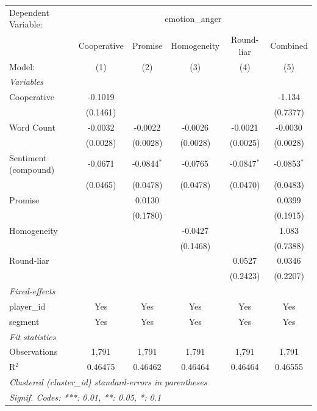 
\begingroup
\centering
\begin{tabular}{lccccc}
   \tabularnewline \midrule \midrule
   Dependent Variable: & \multicolumn{5}{c}{emotion\_anger}\\
                        & Cooperative & Promise       & Homogeneity & Round-liar    & Combined \\   
   Model:               & (1)         & (2)           & (3)         & (4)           & (5)\\  
   \midrule
   \emph{Variables}\\
   Cooperative          & -0.1019     &               &             &               & -1.134\\   
                        & (0.1461)    &               &             &               & (0.7377)\\   
   Word Count           & -0.0032     & -0.0022       & -0.0026     & -0.0021       & -0.0030\\   
                        & (0.0028)    & (0.0028)      & (0.0028)    & (0.0025)      & (0.0028)\\   
   Sentiment (compound) & -0.0671     & -0.0844$^{*}$ & -0.0765     & -0.0847$^{*}$ & -0.0853$^{*}$\\   
                        & (0.0465)    & (0.0478)      & (0.0478)    & (0.0470)      & (0.0483)\\   
   Promise              &             & 0.0130        &             &               & 0.0399\\   
                        &             & (0.1780)      &             &               & (0.1915)\\   
   Homogeneity          &             &               & -0.0427     &               & 1.083\\   
                        &             &               & (0.1468)    &               & (0.7388)\\   
   Round-liar           &             &               &             & 0.0527        & 0.0346\\   
                        &             &               &             & (0.2423)      & (0.2207)\\   
   \midrule
   \emph{Fixed-effects}\\
   player\_id           & Yes         & Yes           & Yes         & Yes           & Yes\\  
   segment              & Yes         & Yes           & Yes         & Yes           & Yes\\  
   \midrule
   \emph{Fit statistics}\\
   Observations         & 1,791       & 1,791         & 1,791       & 1,791         & 1,791\\  
   R$^2$                & 0.46475     & 0.46462       & 0.46464     & 0.46464       & 0.46555\\  
   \midrule \midrule
   \multicolumn{6}{l}{\emph{Clustered (cluster\_id) standard-errors in parentheses}}\\
   \multicolumn{6}{l}{\emph{Signif. Codes: ***: 0.01, **: 0.05, *: 0.1}}\\
\end{tabular}
\par\endgroup


